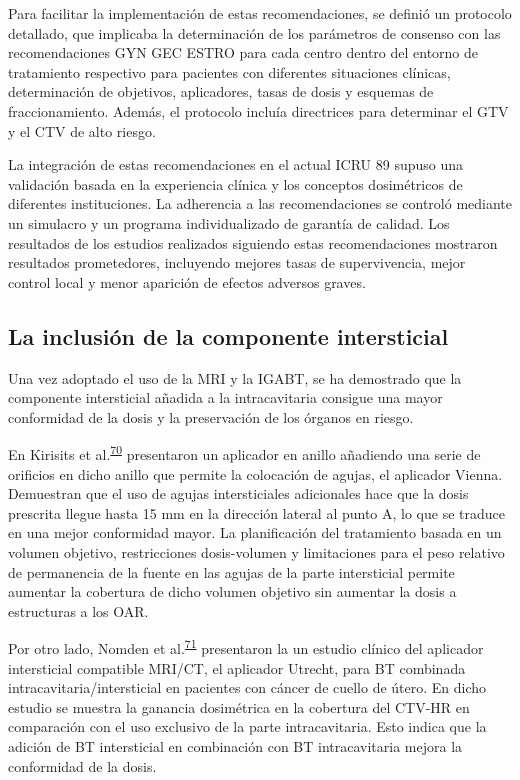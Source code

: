 \documentclass[
  a4paper,
]{scrreprt}
\begin{document}
Para facilitar la implementación de estas recomendaciones, se definió un
protocolo detallado, que implicaba la determinación de los parámetros de
consenso con las recomendaciones GYN GEC ESTRO para cada centro dentro
del entorno de tratamiento respectivo para pacientes con diferentes
situaciones clínicas, determinación de objetivos, aplicadores, tasas de
dosis y esquemas de fraccionamiento. Además, el protocolo incluía
directrices para determinar el GTV y el CTV de alto riesgo.

La integración de estas recomendaciones en el actual ICRU 89 supuso una
validación basada en la experiencia clínica y los conceptos dosimétricos
de diferentes instituciones. La adherencia a las recomendaciones se
controló mediante un simulacro y un programa individualizado de garantía
de calidad. Los resultados de los estudios realizados siguiendo estas
recomendaciones mostraron resultados prometedores, incluyendo mejores
tasas de supervivencia, mejor control local y menor aparición de efectos
adversos graves.

\hypertarget{la-inclusiuxf3n-de-la-componente-intersticial}{%
\subsection{La inclusión de la componente
intersticial}\label{la-inclusiuxf3n-de-la-componente-intersticial}}

Una vez adoptado el uso de la MRI y la IGABT, se ha demostrado que la
componente intersticial añadida a la intracavitaria consigue una mayor
conformidad de la dosis y la preservación de los órganos en riesgo.

En Kirisits et
al.\textsuperscript{\protect\hyperlink{ref-kirisits2006a}{70}}
presentaron un aplicador en anillo añadiendo una serie de orificios en
dicho anillo que permite la colocación de agujas, el aplicador Vienna.
Demuestran que el uso de agujas intersticiales adicionales hace que la
dosis prescrita llegue hasta 15 mm en la dirección lateral al punto A,
lo que se traduce en una mejor conformidad mayor. La planificación del
tratamiento basada en un volumen objetivo, restricciones dosis-volumen y
limitaciones para el peso relativo de permanencia de la fuente en las
agujas de la parte intersticial permite aumentar la cobertura de dicho
volumen objetivo sin aumentar la dosis a estructuras a los OAR.

Por otro lado, Nomden et
al.\textsuperscript{\protect\hyperlink{ref-nomden2012}{71}} presentaron
la un estudio clínico del aplicador intersticial compatible MRI/CT, el
aplicador Utrecht, para BT combinada intracavitaria/intersticial en
pacientes con cáncer de cuello de útero. En dicho estudio se muestra la
ganancia dosimétrica en la cobertura del CTV-HR en comparación con el
uso exclusivo de la parte intracavitaria. Esto indica que la adición de
BT intersticial en combinación con BT intracavitaria mejora la
conformidad de la dosis.
\end{document}
